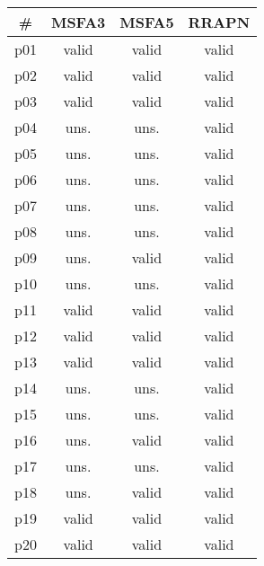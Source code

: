 \begin{tabular}{c||c|c|c}
\textbf{\#} & \textbf{MSFA3} & \textbf{MSFA5} & \textbf{RRAPN}\\
\hline
\hline
p01 & valid & valid & valid\\
p02 & valid & valid & valid\\
p03 & valid & valid & valid\\
p04 & uns. & uns. & valid\\
p05 & uns. & uns. & valid\\
p06 & uns. & uns. & valid\\
p07 & uns. & uns. & valid\\
p08 & uns. & uns. & valid\\
p09 & uns. & valid & valid\\
p10 & uns. & uns. & valid\\
p11 & valid & valid & valid\\
p12 & valid & valid & valid\\
p13 & valid & valid & valid\\
p14 & uns. & uns. & valid\\
p15 & uns. & uns. & valid\\
p16 & uns. & valid & valid\\
p17 & uns. & uns. & valid\\
p18 & uns. & valid & valid\\
p19 & valid & valid & valid\\
p20 & valid & valid & valid\\
\end{tabular}

